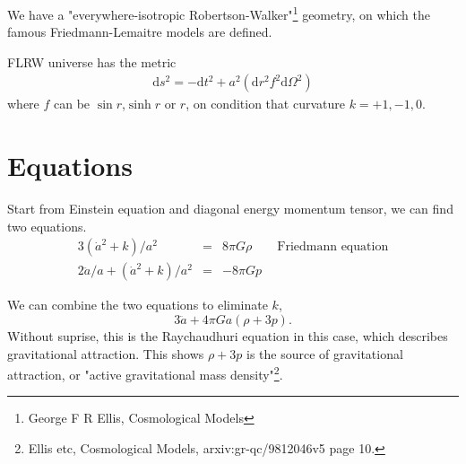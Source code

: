 \documentclass{article}
\begin{document}
We have a "everywhere-isotropic Robertson-Walker"\footnote{George F R Ellis, Cosmological Models} geometry, on which the famous Friedmann-Lemaitre models are defined.


FLRW universe has the metric
\begin{eqnarray}
\mathrm ds^2=-\mathrm dt^2+a^2(\mathrm dr^2f^2\mathrm d\Omega^2)
\end{eqnarray}
where $f$ can be $\sin r$,$\sinh r$ or $r$, on condition that curvature $k=+1,-1,0$.



\section{Equations}

Start from Einstein equation and diagonal energy momentum tensor, we can find two equations.
\begin{eqnarray}
3(\dot a^2+k)/a^2 &=& 8\pi G \rho \text{~~~~~~Friedmann equation}\\
2\ddot a/a+(\dot a^2 +k)/a^2 &=& -8\pi G p
\end{eqnarray}

We can combine the two equations to eliminate $k$,
\begin{equation}
3 \ddot a + 4\pi G a (\rho+3p)    . 
\end{equation}
Without suprise, this is the Raychaudhuri equation in this case, which describes gravitational attraction. This shows $\rho+3p$ is the source of gravitational attraction, or "active gravitational mass density"\footnote{Ellis etc, Cosmological Models, arxiv:gr-qc/9812046v5 page 10.}.











\end{document}
